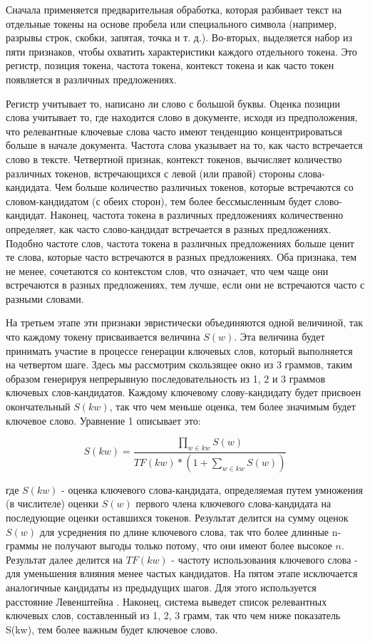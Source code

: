 \documentclass[14pt]{matmex-diploma-custom}
\begin{document}
Сначала применяется предварительная обработка, которая разбивает текст на отдельные токены на основе пробела или специального символа (например, разрывы строк, скобки, запятая, точка и т. д.). Во-вторых, выделяется набор из пяти признаков, чтобы охватить характеристики каждого отдельного токена. Это регистр, позиция токена, частота токена, контекст токена и как часто токен появляется в различных предложениях.

Регистр учитывает то, написано ли слово с большой буквы.
Оценка позиции слова учитывает то, где находится слово в документе, исходя из предположения, что релевантные ключевые слова часто имеют тенденцию концентрироваться больше в начале документа. 
Частота слова указывает на то, как часто встречается слово в тексте. Четвертной признак, контекст токенов, вычисляет количество различных токенов, встречающихся с левой (или правой) стороны слова-кандидата. Чем больше количество различных токенов, которые встречаются со словом-кандидатом (с обеих сторон), тем более бессмысленным будет слово-кандидат. Наконец, частота токена в различных предложениях количественно определяет, как часто слово-кандидат встречается в разных предложениях. Подобно частоте слов, частота токена в различных предложениях больше ценит те слова, которые часто встречаются в разных предложениях. Оба признака, тем не менее, сочетаются со контекстом слов, что означает, что чем чаще они встречаются в разных предложениях, тем лучше, если они не встречаются часто с разными словами. 

На третьем этапе эти признаки  эвристически объединяются одной величиной, так что каждому токену присваивается величина $S(w)$. Эта величина будет принимать участие в  процессе генерации ключевых слов, который выполняется на четвертом шаге. Здесь мы рассмотрим скользящее окно из 3 граммов, таким образом генерируя непрерывную последовательность из 1, 2 и 3 граммов ключевых слов-кандидатов. Каждому ключевому слову-кандидату будет присвоен окончательный $S(kw)$, так что чем меньше оценка, тем более значимым будет ключевое слово. Уравнение 1 описывает это:

\begin{equation}
    S(kw) = \frac{\prod_{w \in kw}{S(w)}}{TF(kw)*(1+\sum_{w\in kw}{S(w)})}
\end{equation}

где $S(kw)$ - оценка ключевого слова-кандидата, определяемая путем умножения (в числителе) оценки $S(w)$ первого члена ключевого слова-кандидата на последующие оценки оставшихся токенов. Результат делится на сумму оценок $S(w)$ для усреднения по длине ключевого слова, так что более длинные n-граммы не получают выгоды только потому, что они имеют более высокое $n$. Результат далее делится на $TF(kw)$ - частоту использования ключевого слова - для уменьшения влияния менее частых кандидатов. На пятом этапе исключается аналогичные кандидаты из предыдущих шагов. Для этого используется расстояние Левенштейна \cite{Levenshtein_SPD66}. Наконец, система выведет список релевантных ключевых слов, составленный из 1, 2, 3 грамм, так что чем ниже показатель S(kw), тем более важным будет ключевое слово.
\end{document}
